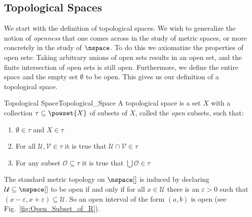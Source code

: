 \documentclass[oneside]{book}                                                  %
\begin{document}
            \subsection{Topological Spaces}
                We start with the definition of topological spaces. We wish to
                generalize the notion of \textit{openness} that one comes across
                in the study of metric spaces, or more
                concretely in the study of $\nspace$. To do this we axiomatize
                the properties of open sets: Taking arbitrary unions of open
                sets results in an open set, and the finite intersection of open
                sets is still open. Furthermore, we define the entire space and
                the empty set $\emptyset$ to be open. This gives us our
                definition of a topological space.
                \begin{fdefinition}{Topological Space}{Topological_Space}
                    A topological space is a set $X$ with a collection
                    $\tau\subseteq\powset{X}$ of subsets of $X$, called the
                    \textit{open} subsets, such that:
                    \begin{enumerate}
                        \item \label{def:top:Empty_and_X_Open}%
                              $\emptyset\in\tau$ and $X\in\tau$
                        \item \label{def:top:Finite_Intersections}%
                              For all $\mathcal{U},\mathcal{V}\in\tau$ it is
                              true that $\mathcal{U}\cap\mathcal{V}\in\tau$
                        \item \label{def:top:Arbitrary_Unions}%
                              For any subset $\mathcal{O}\subseteq\tau$ it is
                              true that $\bigcup\mathcal{O}\in\tau$
                    \end{enumerate}
                \end{fdefinition}
                \begin{example}
                    The standard metric topology on $\nspace[]$ is induced by
                    declaring $\mathcal{U}\subseteq\nspace[]$ to be open if and
                    only if for all $x\in\mathcal{U}$ there is an
                    $\varepsilon>0$ such that
                    $(x-\varepsilon,x+\varepsilon)\subseteq\mathcal{U}$. So an
                    open interval of the form $(a,b)$ is open
                    (see Fig.~\ref{fig:Open_Subset_of_R}).
                \end{example}
\end{document}
